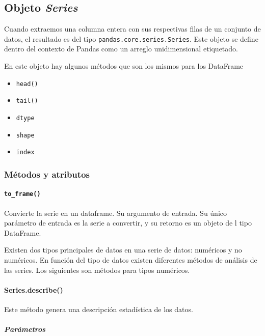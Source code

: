 \subsection{Objeto \textit{Series}}

Cuando extraemos una columna entera con sus respectivas filas de un conjunto de
datos, el resultado es del tipo \texttt{pandas.core.series.Series}. Este objeto
se define dentro del contexto de Pandas como un arreglo unidimensional
etiquetado.

En este objeto hay algunos métodos que son los mismos para los DataFrame

\begin{itemize}
    \item \texttt{head()}
    \item \texttt{tail()}
    \item \texttt{dtype}
    \item \texttt{shape}
    \item \texttt{index}
\end{itemize}

\subsubsection{Métodos y atributos}

\paragraph{\texttt{to\_frame()}} Convierte la serie en un dataframe. Su
argumento de entrada. Su único parámetro de entrada es la serie a convertir, y
su retorno es un objeto de l tipo DataFrame.

Existen dos tipos principales de datos en una serie de datos: numéricos y no
numéricos. En función del tipo de datos existen diferentes métodos de análisis
de las series. Los siguientes son métodos para tipos numéricos.

\paragraph{Series.describe()} Este método genera una descripción estadística de
los datos.

\subparagraph{Parámetros}

